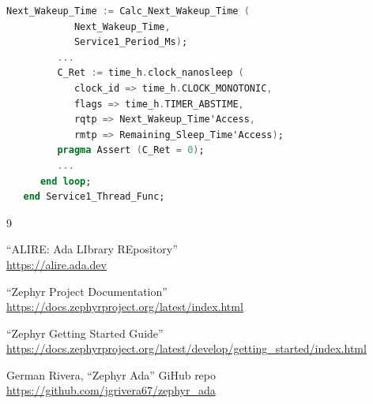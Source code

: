 \documentclass{AUJarticle}
\begin{document}
\begin{itemize}
\begin{lstlisting}[language=Ada, basicstyle=\ttfamily\scriptsize]
         Next_Wakeup_Time := Calc_Next_Wakeup_Time (
            Next_Wakeup_Time,
            Service1_Period_Ms);
         ...
         C_Ret := time_h.clock_nanosleep (
            clock_id => time_h.CLOCK_MONOTONIC,
            flags => time_h.TIMER_ABSTIME,
            rqtp => Next_Wakeup_Time'Access,
            rmtp => Remaining_Sleep_Time'Access);
         pragma Assert (C_Ret = 0);
         ...
      end loop;
   end Service1_Thread_Func;
\end{lstlisting}
\end{itemize}

\begin{thebibliography}{9}

``ALIRE: Ada LIbrary REpository'' \\
\url{https://alire.ada.dev}

``Zephyr Project Documentation'' \\
\url{https://docs.zephyrproject.org/latest/index.html}

``Zephyr Getting Started Guide'' \\
\url{https://docs.zephyrproject.org/latest/develop/getting_started/index.html}

German Rivera, ``Zephyr Ada'' GiHub repo \\
\url{https://github.com/jgrivera67/zephyr_ada}

\end{thebibliography}
\end{document}
